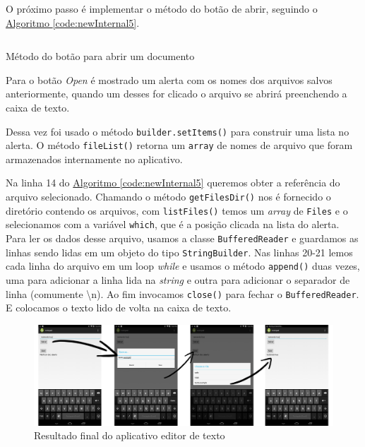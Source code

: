 \documentclass[a4paper,12pt,brazil,oneside]{book}
\begin{document}
		O próximo passo é implementar o método do botão de abrir, seguindo o \hyperref[code:newInternal5]{Algoritmo \ref*{code:newInternal5}}.
		
		\begin{listing}[H]
		\inputminted[linenos=true,fontsize=\small,frame=lines, framesep=2mm, tabsize=2,numbersep=5pt]{java}{src/api/storage/newInternal3.java}
		\caption{Método do botão para abrir um documento}
		\label{code:newInternal5}
		\end{listing} 
 
		Para o botão \emph{Open} é mostrado um alerta com os nomes dos arquivos salvos anteriormente, quando um desses for clicado o arquivo se abrirá preenchendo a caixa de texto.
	
		Dessa vez foi usado o método \texttt{builder.setItems()} para construir uma lista no alerta. O método \texttt{fileList()} retorna um \texttt{array} de nomes de arquivo que foram armazenados internamente no aplicativo. 
		
		Na linha 14 do \hyperref[code:newInternal5]{Algoritmo \ref*{code:newInternal5}} queremos obter a referência do arquivo selecionado. Chamando o método \texttt{getFilesDir()} nos é fornecido o diretório contendo os arquivos, com \texttt{listFiles()} temos um \emph{array} de \texttt{Files} e o selecionamos com a variável \texttt{which}, que é a posição clicada na lista do alerta. Para ler os dados desse arquivo, usamos a classe \texttt{BufferedReader} e guardamos as linhas sendo lidas em um objeto do tipo \texttt{StringBuilder}. Nas linhas 20-21 lemos cada linha do arquivo em um loop \emph{while} e usamos o método \texttt{append()} duas vezes, uma para adicionar a linha lida na \emph{string} e outra para adicionar o separador de linha (comumente \textbackslash n). Ao fim invocamos \texttt{close()} para fechar o \texttt{BufferedReader}. E colocamos o texto lido de volta na caixa de texto.

		\begin{figure}[H]
  \centering
  \includegraphics[width=1\textwidth]{figuras/api/internal/internalFinal.png}
  \caption{Resultado final do aplicativo editor de texto}
  \label{fig:newInternalFinal}
\end{figure}
\end{document}
